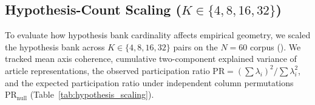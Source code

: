 \subsection{Hypothesis-Count Scaling ($K \in \{4, 8, 16, 32\}$)}
\label{sec:hypothesis_scaling_results}

To evaluate how hypothesis bank cardinality affects empirical geometry, we scaled the hypothesis bank across $K \in \{4, 8, 16, 32\}$ pairs on the $N=60$ corpus (). We tracked mean axis coherence, cumulative two-component explained variance of article representations, the observed participation ratio $\mathrm{PR} = (\sum \lambda_i)^2 / \sum \lambda_i^2$, and the expected participation ratio under independent column permutations $\mathrm{PR}_{\text{null}}$ (Table~\ref{tab:hypothesis_scaling}).

\begin{table}[htbp]
\centering
\small
{}
\caption{Hypothesis-count scaling metrics across $K \in \{4, 8, 16, 32\}$ pairs ($N=60$, DeBERTa-v2-xlarge-mnli), benchmarked against column permutation null participation ratios.}
\label{tab:hypothesis_scaling}
\end{table}

